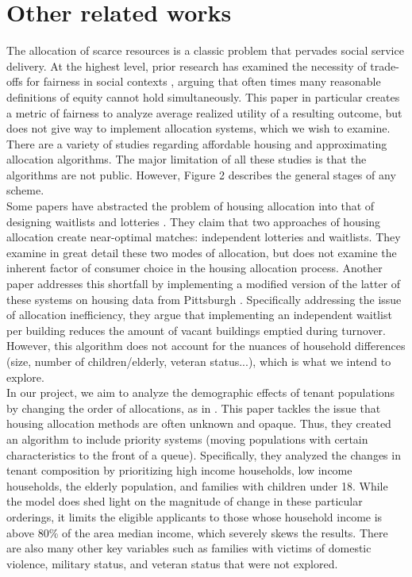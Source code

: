 \documentclass[11pt]{article}
\begin{document}
\section{Other related works}
The allocation of scarce resources is a classic problem that pervades social service delivery. At the highest level, prior research has examined the necessity of trade-offs for fairness in social contexts \cite{mashiat2022trade}, arguing that often times many reasonable definitions of equity cannot hold simultaneously. This paper in particular creates a metric of fairness to analyze average realized utility of a resulting outcome, but does not give way to implement allocation systems, which we wish to examine. \\
\newline
There are a variety of studies regarding affordable housing and approximating allocation algorithms. The major limitation of all these studies is that the algorithms are not public. However, Figure 2 describes the general stages of any scheme.\\
\newline
Some papers have abstracted the problem of housing allocation into that of designing waitlists and lotteries \cite{arnosti2020design}. They claim that two approaches of housing allocation create near-optimal matches: independent lotteries and waitlists. They examine in great detail these two modes of allocation, but does not examine the inherent factor of consumer choice in the housing allocation process. Another paper addresses this shortfall by implementing a modified version of the latter of these systems on housing data from Pittsburgh \cite{harvardpublichousing}. Specifically addressing the issue of allocation inefficiency, they argue that implementing an independent waitlist per building reduces the amount of vacant buildings emptied during turnover. However, this algorithm does not account for the nuances of household differences (size, number of children/elderly, veteran status...), which is what we intend to explore. \\
\newline
In our project, we aim to analyze the demographic effects of tenant populations by changing the order of allocations, as in \cite{nyuaffordablehousing}. This paper tackles the issue that housing allocation methods are often unknown and opaque. Thus, they created an algorithm to include priority systems (moving populations with certain characteristics to the front of a queue). Specifically, they analyzed the changes in tenant composition by prioritizing high income households, low income households, the elderly population, and families with children under 18. While the model does shed light on the magnitude of change in these particular orderings, it limits the eligible applicants to those whose household income is above 80\% of the area median income, which severely skews the results. There are also many other key variables such as families with victims of domestic violence, military status, and veteran status that were not explored.\\
\end{document}
